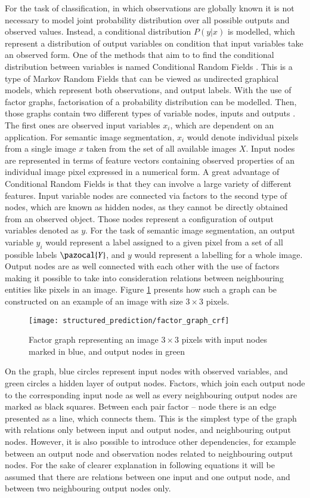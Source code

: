 For the task of classification, in which observations are globally known it is not necessary to model joint probability distribution over all possible outputs and observed values. Instead, a conditional distribution $P(y|x)$ is modelled, which represent a distribution of output variables on condition that input variables take an observed form. One of the methods that aim to to find the conditional distribution between variables is named Conditional Random Fields \cite{crf_lafferty}. This is a type of Markov Random Fields that can be viewed as undirected graphical models, which represent both observations, and output labels. With the use of factor graphs, factorisation of a probability distribution can be modelled. Then, those graphs contain two different types of variable nodes, inputs and outputs \cite{crf_sutton}. The first ones are observed input variables $x_i$, which are dependent on an application. For semantic image segmentation, $x_i$ would denote individual pixels from a single image $x$ taken from the set of all available images $X$. Input nodes are represented in terms of feature vectors containing observed properties of an individual image pixel expressed in a numerical form. A great advantage of Conditional Random Fields is that they can involve a large variety of different features. Input variable nodes are connected via factors to the second type of nodes, which are known as hidden nodes, as they cannot be directly obtained from an observed object. Those nodes represent a configuration of output variables denoted as $y$. For the task of semantic image segmentation, an output variable $y_i$ would represent a label assigned to a given pixel from a set of all possible labels $\pazocal{Y}$, and $y$ would represent a labelling for a whole image. Output nodes are as well connected with each other with the use of factors making it possible to take into consideration relations between neighbouring entities like pixels in an image. Figure \ref{fig:factor_graph_crf} presents how such a graph can be constructed on an example of an image with size $3\times3$ pixels.
\begin{figure}[ht]
    \centering
    \texttt{[image: structured\_prediction/factor\_graph\_crf]}
    \caption{Factor graph representing an image $3\times3$ pixels with input nodes marked in blue, and output nodes in green}
     \label{fig:factor_graph_crf}
\end{figure}

On the graph, blue circles represent input nodes with observed variables, and green circles a hidden layer of output nodes. Factors, which join each output node to the corresponding input node as well as every neighbouring output nodes are marked as black squares. Between each pair factor – node there is an edge presented as a line, which connects them. This is the simplest type of the graph with relations only between input and output nodes, and neighbouring output nodes. However, it is also possible to introduce other dependencies, for example between an output node and observation nodes related to neighbouring output nodes. For the sake of clearer explanation in following equations it will be assumed that there are relations between one input and one output node, and between two neighbouring output nodes only.

